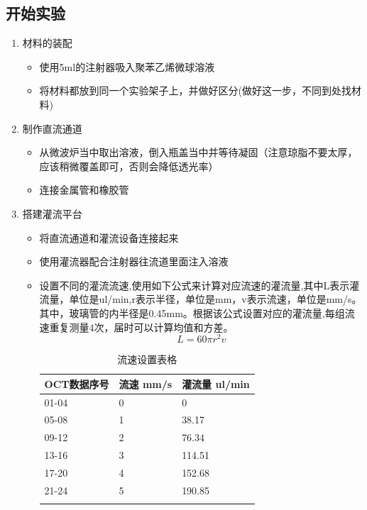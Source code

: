 \documentclass[12pt]{article}
\begin{document}
\subsection{开始实验}
\begin{enumerate}
    \item 材料的装配
    \begin{itemize}
        \item 使用5ml的注射器吸入聚苯乙烯微球溶液
        \item 将材料都放到同一个实验架子上，并做好区分(做好这一步，不同到处找材料)
    \end{itemize}

    \item 制作直流通道
    \begin{itemize}
        \item 从微波炉当中取出溶液，倒入瓶盖当中并等待凝固（注意琼脂不要太厚，应该稍微覆盖即可，否则会降低透光率）
        \item 连接金属管和橡胶管
    \end{itemize}

    \item 搭建灌流平台
    \begin{itemize}
        \item 将直流通道和灌流设备连接起来
        \item 使用灌流器配合注射器往流道里面注入溶液
        \item 设置不同的灌流流速,使用如下公式来计算对应流速的灌流量,其中L表示灌流量，单位是ul/min,r表示半径，单位是mm，v表示流速，单位是mm/s。其中，玻璃管的内半径是0.45mm。根据该公式设置对应的灌流量,每组流速重复测量4次，届时可以计算均值和方差。
        \begin{equation}
            L=60 \pi r^2 v
        \end{equation}

        \footnotesize
        \begin{longtable}{@{} p{5cm} p{5cm} p{5cm} @{}}
            \toprule
            \textbf{OCT数据序号} & \textbf{流速 mm/s} & \textbf{灌流量 ul/min} \\ 
            \midrule
            01-04 & 0 & 0 \\
            05-08 & 1 & 38.17 \\
            09-12 & 2 & 76.34 \\
            13-16 & 3 & 114.51 \\
            17-20 & 4 & 152.68 \\
            21-24 & 5 & 190.85 \\
            \bottomrule
            \caption{流速设置表格} \\
        \end{longtable}
    \end{itemize}


\end{enumerate}
\end{document}
